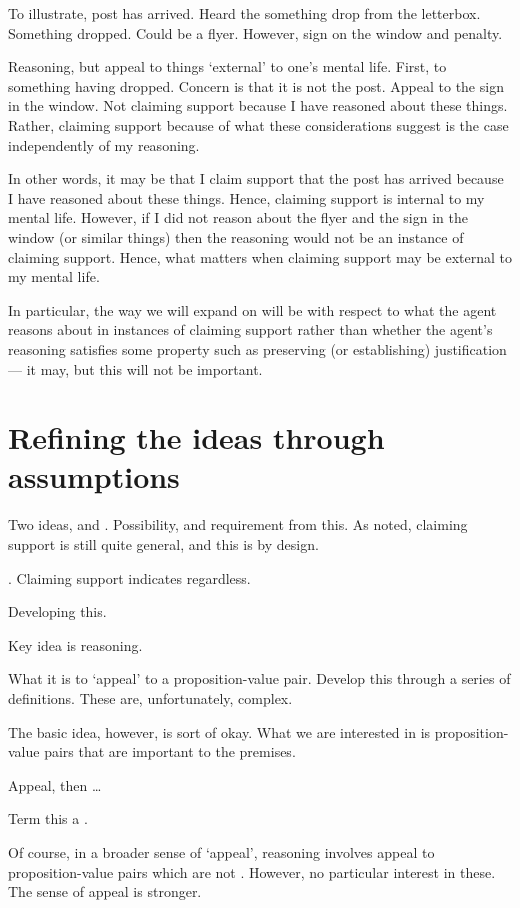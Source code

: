 \begin{note}[Illustration of I/E]
  To illustrate, post has arrived.
  Heard the something drop from the letterbox.
  Something dropped.
  Could be a flyer.
  However, sign on the window and penalty.

  Reasoning, but appeal to things `external' to one's mental life.
  First, to something having dropped.
  Concern is that it is not the post.
  Appeal to the sign in the window.
  Not claiming support because I have reasoned about these things.
  Rather, claiming support because of what these considerations suggest is the case independently of my reasoning.

  In other words, it may be that I claim support that the post has arrived because I have reasoned about these things.
  Hence, claiming support is internal to my mental life.
  However, if I did not reason about the flyer and the sign in the window (or similar things) then the reasoning would not be an instance of claiming support.
  Hence, what matters when claiming support may be external to my mental life.
\end{note}

\begin{note}
  In particular, the way we will expand on \ideaCSB{} will be with respect to what the agent reasons about in instances of claiming support rather than whether the agent's reasoning satisfies some property such as preserving (or establishing) justification --- it may, but this will not be important.
\end{note}

\section{Refining the ideas through assumptions}
\label{sec:assumpt-from-ideas}

\begin{note}
  Two ideas, \ideaCSA{} and \ideaCSB{}.
  Possibility, and requirement from this.
  As noted, claiming support is still quite general, and this is by design.
\end{note}

\begin{note}
  \ideaCSB{}.
  Claiming support indicates regardless.

  Developing this.

  Key idea is reasoning.

  What it is to `appeal' to a proposition-value pair.
  Develop this through a series of definitions.
  These are, unfortunately, complex.

  The basic idea, however, is sort of okay.
  What we are interested in is proposition-value pairs that are important to the premises.

  \begin{idea}
    Appeal, then \dots
  \end{idea}

  Term this a \requ{}.

  Of course, in a broader sense of `appeal', reasoning involves appeal to proposition-value pairs which are not .
  However, no particular interest in these.
  The sense of appeal is stronger.
\end{note}


